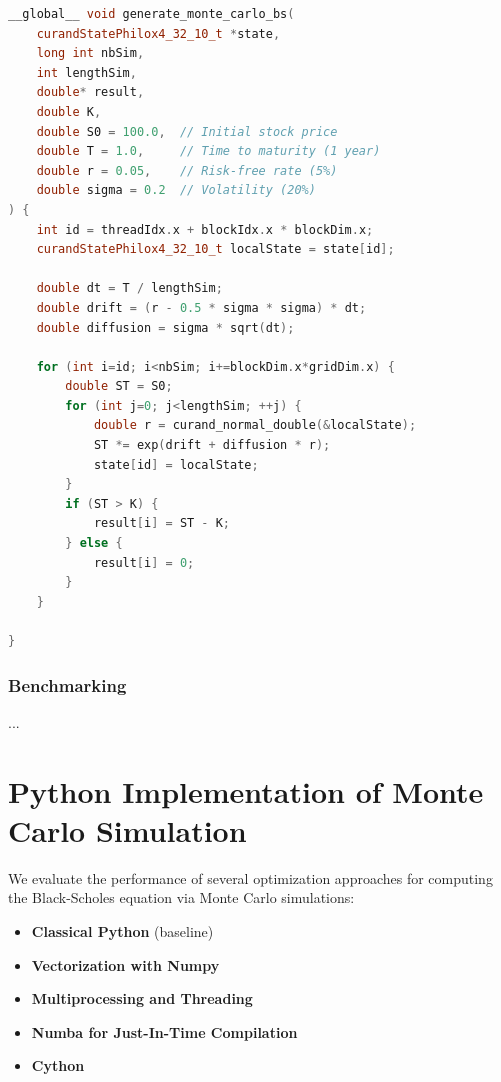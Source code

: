 \documentclass[12pt,a4paper]{report}
\begin{document}
\begin{tcolorbox}[colback=blue!5!white, colframe=blue!50!black, title=Cuda compute simulation]
\begin{lstlisting}[language=C++]
__global__ void generate_monte_carlo_bs(
    curandStatePhilox4_32_10_t *state,
    long int nbSim,
    int lengthSim,
    double* result,
    double K,
    double S0 = 100.0,  // Initial stock price
    double T = 1.0,     // Time to maturity (1 year)
    double r = 0.05,    // Risk-free rate (5%)
    double sigma = 0.2  // Volatility (20%)
) {
    int id = threadIdx.x + blockIdx.x * blockDim.x;
    curandStatePhilox4_32_10_t localState = state[id];

    double dt = T / lengthSim;
    double drift = (r - 0.5 * sigma * sigma) * dt;
    double diffusion = sigma * sqrt(dt);

    for (int i=id; i<nbSim; i+=blockDim.x*gridDim.x) {
        double ST = S0;
        for (int j=0; j<lengthSim; ++j) {
            double r = curand_normal_double(&localState);
            ST *= exp(drift + diffusion * r);
            state[id] = localState;
        }
        if (ST > K) {
            result[i] = ST - K;
        } else {
            result[i] = 0;
        }
    }

}
\end{lstlisting}
\end{tcolorbox}

\subsubsection{Benchmarking}
...



\section{Python Implementation of Monte Carlo Simulation}

We evaluate the performance of several optimization approaches for computing the Black-Scholes equation via Monte Carlo simulations:

\begin{itemize}
    \item \textbf{Classical Python} (baseline)
    \item \textbf{Vectorization with Numpy}
    \item \textbf{Multiprocessing and Threading}
    \item \textbf{Numba for Just-In-Time Compilation}
    \item \textbf{Cython}
\end{itemize}
\end{document}
